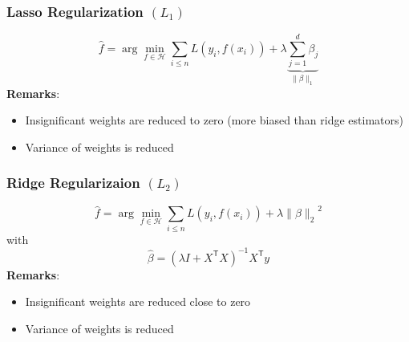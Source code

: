 \subsubsection[Lasso Regularization]{Lasso Regularization $(L_1)$}
\noindent\begin{equation*}
    \widehat{f} =\arg\min_{f\in\mathcal{H}}\sum_{i\leq n}L(y_{i},f(x_{i})) + \lambda \underbrace{\sum_{j=1}^{d} \beta_j}_{\|\beta\|_1}
\end{equation*}
\textbf{Remarks}:
\begin{itemize}
    \item Insignificant weights are reduced to zero (more biased than ridge estimators)
    \item Variance of weights is reduced
\end{itemize}

\subsubsection[Ride Regularization]{Ridge Regularizaion $(L_2)$}
\noindent\begin{equation*}
    \widehat{f} =\arg\min_{f\in\mathcal{H}}\sum_{i\leq n}L(y_{i},f(x_{i})) + \lambda{\|\beta\|_2}^2
\end{equation*}
with 
\noindent\begin{equation*}
    \hat{\beta}={(\lambda I+X^{\mathsf{T}}X)}^{-1}X^{\mathsf{T}}y
\end{equation*}
\textbf{Remarks}:
\begin{itemize}
    \item Insignificant weights are reduced close to zero
    \item Variance of weights is reduced
\end{itemize}